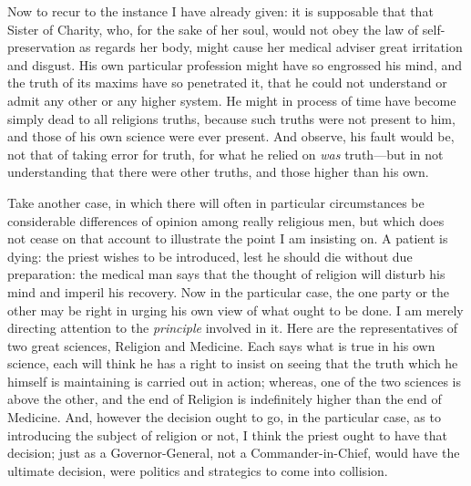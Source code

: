 Now to recur to the instance I have already given: it is supposable
that that Sister of Charity, who, for the sake of her soul, would not
obey the law of self-preservation as regards her body, might cause her
medical adviser great irritation and disgust. His own particular
profession might have so engrossed his mind, and the truth of its
maxims have so penetrated it, that he could not understand or admit
any other or any higher system. He might in process of time have
become simply dead to all religions truths, because such truths were
not present to him, and those of his own science were ever present.
And observe, his fault would be, not that of taking error for truth,
for what he relied on \emph{was} truth—but in not understanding that
there were other truths, and those higher than his own.

Take another case, in which there will often in particular
circumstances be considerable differences of opinion among really
religious men, but which does not cease on that account to illustrate
the point I am insisting on. A patient is dying: the priest wishes to
be introduced, lest he should die without due preparation: the medical
man says that the thought of religion will disturb his mind and
imperil his recovery. Now in the particular case, the one party or the
other may be right in urging his own view of what ought to be done. I
am merely directing attention to the \emph{principle} involved in it.
Here are the representatives of two great sciences, Religion and
Medicine. Each says what is true in his own science, each will think
he has a right to insist on seeing that the truth which he himself is
maintaining is carried out in action; whereas, one of the two sciences
is above the other, and the end of Religion is indefinitely higher
than the end of Medicine. And, however the decision ought to go, in
the particular case, as to introducing the subject of religion or not,
I think the priest ought to have that decision; just as a
Governor-General, not a Commander-in-Chief, would have the ultimate
decision, were politics and strategics to come into collision.

